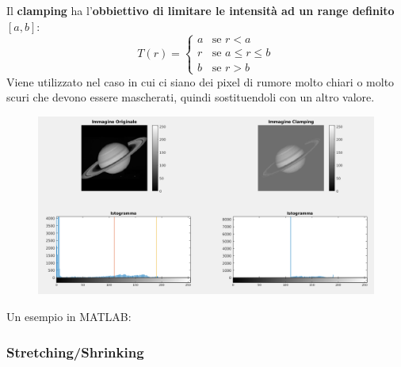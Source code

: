 \documentclass[a4paper]{article}
\begin{document}
	Il \textcolor{Red3}{\textbf{clamping}} ha l'\textbf{obbiettivo di limitare le intensità ad un range definito} $\left[a,b\right]$:
	\begin{equation*}
		T\left(r\right) = \begin{cases}
			a & \text{se } r < a  \\
			r & \text{se } a \le r \le b  \\
			b & \text{se } r > b
		\end{cases}
	\end{equation*}
	Viene utilizzato nel caso in cui ci siano dei pixel di rumore molto chiari o molto scuri che devono essere mascherati, quindi sostituendoli con un altro valore.
	\begin{figure}[!htp]
		\centering
		\includegraphics[width=\textwidth]{img/lab/clamping.png}
	\end{figure}
	
	\noindent
	Un esempio in MATLAB:
	\newpage
	
	\subsubsection{Stretching/Shrinking}
	
\end{document}
